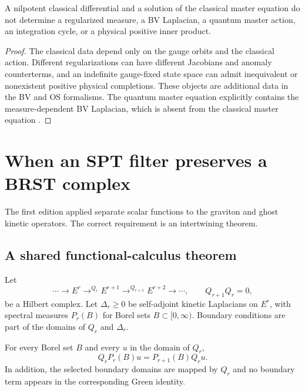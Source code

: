\documentclass[11pt]{article}
\begin{document}
\begin{proposition}
A nilpotent classical differential and a solution of the classical master
equation do not determine a regularized measure, a BV Laplacian, a quantum
master action, an integration cycle, or a physical positive inner product.
\end{proposition}

\begin{proof}
The classical data depend only on the gauge orbits and the classical action.
Different regularizations can have different Jacobians and anomaly
counterterms, and an indefinite gauge-fixed state space can admit inequivalent
or nonexistent positive physical completions.  These objects are additional
data in the BV and OS formalisms.  The quantum master equation explicitly
contains the measure-dependent BV Laplacian, which is absent from the classical
master equation \cite{Schwarz1993,Costello2007}.
\end{proof}

\section{When an SPT filter preserves a BRST complex}

The first edition applied separate scalar functions to the graviton and ghost
kinetic operators.  The correct requirement is an intertwining theorem.

\subsection{A shared functional-calculus theorem}

Let
\[
 \cdots\longrightarrow E^r
 \mathop{\longrightarrow}^{Q_r} E^{r+1}
 \mathop{\longrightarrow}^{Q_{r+1}} E^{r+2}
 \longrightarrow\cdots,
 \qquad Q_{r+1}Q_r=0,
\]
be a Hilbert complex.  Let $\Delta_r\ge0$ be self-adjoint kinetic Laplacians on
$E^r$, with spectral measures $P_r(B)$ for Borel sets
$B\subset[0,\infty)$.  Boundary conditions are part of the domains of $Q_r$
and $\Delta_r$.

\begin{assumption}\label{ass:chain}
For every Borel set $B$ and every $u$ in the domain of $Q_r$,
\[
 Q_rP_r(B)u=P_{r+1}(B)Q_ru.
\]
In addition, the selected boundary domains are mapped by $Q_r$ and no boundary
term appears in the corresponding Green identity.
\end{assumption}
\end{document}
